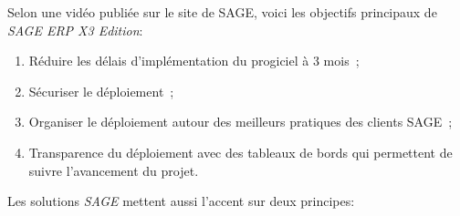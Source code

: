             Selon une vidéo publiée sur le site de SAGE, voici les objectifs principaux de \textit{SAGE ERP X3 Edition}:

            \begin{enumerate}
                \item Réduire les délais d'implémentation du progiciel à 3 mois~;
                \item Sécuriser le déploiement~;
                \item Organiser le déploiement autour des meilleurs pratiques des clients SAGE~;
                \item Transparence du déploiement avec des tableaux de bords qui permettent de suivre l'avancement du projet.
            \end{enumerate}

            Les solutions \textit{SAGE} mettent aussi l'accent sur deux principes:

